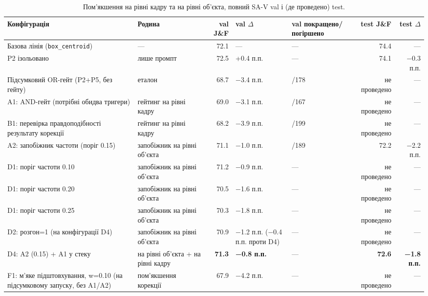 \documentclass[11pt]{article}
\begin{document}
\begin{table}[!htbp]
\centering
\footnotesize
\caption{Пом'якшення на рівні кадру та на рівні об'єкта, повний SA-V val і (де проведено) test.}
\label{tab:8}
\footnotesize
\begin{tabularx}{\textwidth}{@{}>{\raggedright\arraybackslash\hsize=1.3\hsize}X>{\raggedright\arraybackslash\hsize=1.0\hsize}Xr>{\raggedleft\arraybackslash\hsize=1.0\hsize}X>{\raggedleft\arraybackslash\hsize=0.7\hsize}Xrr@{}}
\toprule
Конфігурація & Родина & val J\&F & val $\Delta$ & val покращено/ погіршено & test J\&F & test $\Delta$ \\
\midrule
Базова лінія (\texttt{box\_centroid}) & --- & 72.1 & --- & --- & 74.4 & --- \\
P2 ізольовано & лише промпт & 72.5 & +0.4 п.п. & --- & 74.1 & −0.3 п.п. \\
Підсумковий OR-гейт (P2+P5, без гейту) & еталон & 68.7 & −3.4 п.п. & 44/178 & не проведено & --- \\
A1: AND-гейт (потрібні обидва тригери) & гейтинг на рівні кадру & 69.0 & −3.1 п.п. & 50/167 & не проведено & --- \\
B1: перевірка правдоподібності результату корекції & гейтинг на рівні кадру & 68.2 & −3.9 п.п. & 48/199 & не проведено & --- \\
A2: запобіжник частоти (поріг 0.15) & запобіжник на рівні об'єкта & 71.1 & −1.0 п.п. & 49/189 & 72.2 & −2.2 п.п. \\
D1: поріг частоти 0.10 & запобіжник на рівні об'єкта & 71.2 & −0.9 п.п. & --- & не проведено & --- \\
D1: поріг частоти 0.20 & запобіжник на рівні об'єкта & 70.5 & −1.6 п.п. & --- & не проведено & --- \\
D1: поріг частоти 0.25 & запобіжник на рівні об'єкта & 70.3 & −1.8 п.п. & --- & не проведено & --- \\
D2: розгон=1 (на конфігурації D4) & запобіжник на рівні об'єкта & 70.9 & −1.2 п.п. (−0.4 п.п. проти D4) & --- & не проведено & --- \\
D4: A2 (0.15) + A1 у стеку & на рівні об'єкта + на рівні кадру & \textbf{71.3} & \textbf{−0.8 п.п.} & --- & \textbf{72.6} & \textbf{−1.8 п.п.} \\
F1: м'яке підштовхування, w=0.10 (на підсумковому запуску, без A1/A2) & пом'якшення корекції & 67.9 & −4.2 п.п. & --- & не проведено & --- \\
\bottomrule
\end{tabularx}
\end{table}
\end{document}
